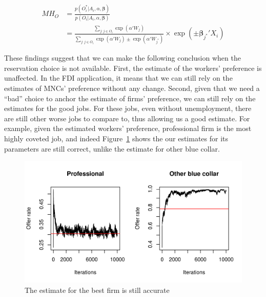 \begin{align}
  MH_O &= \frac{p(O_i^* | A_i, \alpha, \bm{\beta})}{p(O_i | A_i, \alpha, \bm{\beta})} \\
       &= \frac{\sum\limits_{j:j \in O_i} \exp(\alpha'W_j)}{\sum\limits_{j:j \in O_i} \exp(\alpha'W_j) \pm \exp(\alpha' W_{j^*})} \times \exp(\pm \bm{\beta}_{j^*}'X_i)
\end{align}

These findings suggest that we can make the following conclusion when the
reservation choice is not available. First, the estimate of the workers'
preference is unaffected. In the FDI application, it means that we can still
rely on the estimates of MNCs' preference without any change. Second, given that
we need a ``bad'' choice to anchor the estimate of firms' preference, we can
still rely on the estimates for the good jobs. For these jobs, even without
unemployment, there are still other worse jobs to compare to, thus allowing us a
good estimate. For example, given the estimated workers' preference,
professional firm is the most highly coveted job, and indeed
Figure~\ref{fig:sim_labor_nojobs_nounemp_offer_rate} shows the our estimates for
its parameters are still correct, unlike the estimate for other blue collar.

\begin{figure}[!ht]
  \centering
  \includegraphics[width=\textwidth,keepaspectratio]{../figure/sim_labor_nojobs_nounemp_offer_rate}
  \caption{The estimate for the best firm is still accurate}
  \label{fig:sim_labor_nojobs_nounemp_offer_rate}
\end{figure}

